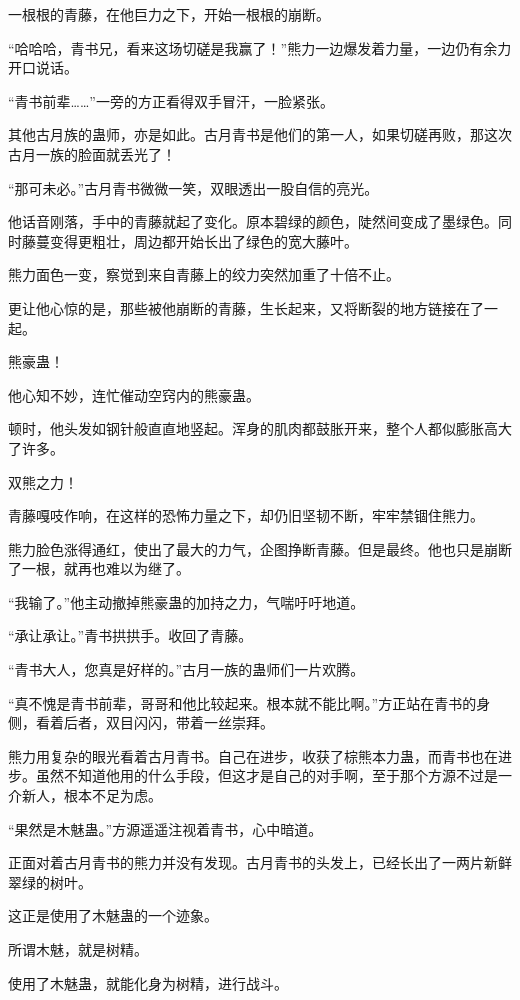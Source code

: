 \begin{this_body}
一根根的青藤，在他巨力之下，开始一根根的崩断。

“哈哈哈，青书兄，看来这场切磋是我赢了！”熊力一边爆发着力量，一边仍有余力开口说话。

“青书前辈……”一旁的方正看得双手冒汗，一脸紧张。

其他古月族的蛊师，亦是如此。古月青书是他们的第一人，如果切磋再败，那这次古月一族的脸面就丢光了！

“那可未必。”古月青书微微一笑，双眼透出一股自信的亮光。

他话音刚落，手中的青藤就起了变化。原本碧绿的颜色，陡然间变成了墨绿色。同时藤蔓变得更粗壮，周边都开始长出了绿色的宽大藤叶。

熊力面色一变，察觉到来自青藤上的绞力突然加重了十倍不止。

更让他心惊的是，那些被他崩断的青藤，生长起来，又将断裂的地方链接在了一起。

熊豪蛊！

他心知不妙，连忙催动空窍内的熊豪蛊。

顿时，他头发如钢针般直直地竖起。浑身的肌肉都鼓胀开来，整个人都似膨胀高大了许多。

双熊之力！

青藤嘎吱作响，在这样的恐怖力量之下，却仍旧坚韧不断，牢牢禁锢住熊力。

熊力脸色涨得通红，使出了最大的力气，企图挣断青藤。但是最终。他也只是崩断了一根，就再也难以为继了。

“我输了。”他主动撤掉熊豪蛊的加持之力，气喘吁吁地道。

“承让承让。”青书拱拱手。收回了青藤。

“青书大人，您真是好样的。”古月一族的蛊师们一片欢腾。

“真不愧是青书前辈，哥哥和他比较起来。根本就不能比啊。”方正站在青书的身侧，看着后者，双目闪闪，带着一丝崇拜。

熊力用复杂的眼光看着古月青书。自己在进步，收获了棕熊本力蛊，而青书也在进步。虽然不知道他用的什么手段，但这才是自己的对手啊，至于那个方源不过是一介新人，根本不足为虑。

“果然是木魅蛊。”方源遥遥注视着青书，心中暗道。

正面对着古月青书的熊力并没有发现。古月青书的头发上，已经长出了一两片新鲜翠绿的树叶。

这正是使用了木魅蛊的一个迹象。

所谓木魅，就是树精。

使用了木魅蛊，就能化身为树精，进行战斗。


\end{this_body}
